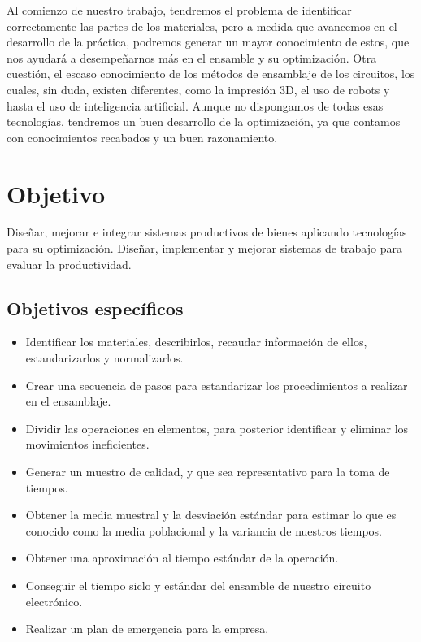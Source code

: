     Al comienzo de nuestro trabajo, tendremos el problema de identificar correctamente las partes de los materiales, pero a medida que avancemos en el desarrollo de la práctica, podremos generar un mayor conocimiento de estos, que nos ayudará a desempeñarnos más en el ensamble y su optimización.
    Otra cuestión, el escaso conocimiento de los métodos de ensamblaje de los circuitos, los cuales, sin duda, existen diferentes, como la impresión 3D, el uso de robots y hasta el uso de inteligencia artificial. Aunque no dispongamos de todas esas tecnologías, tendremos un buen desarrollo de la optimización, ya que contamos con conocimientos recabados y un buen razonamiento.
    
    
    \section{Objetivo}
    
    Diseñar, mejorar e integrar sistemas productivos de bienes aplicando tecnologías para su optimización. Diseñar, implementar y mejorar sistemas de trabajo para evaluar la productividad.
    
    
    \subsection{Objetivos específicos}
    
    \begin{itemize}
        \item Identificar los materiales, describirlos, recaudar información de ellos, estandarizarlos y normalizarlos.
        \item Crear una secuencia de pasos para estandarizar los procedimientos a realizar en el ensamblaje.
        \item Dividir las operaciones en elementos, para posterior identificar y eliminar los movimientos ineficientes.
        \item Generar un muestro de calidad, y que sea representativo para la toma de tiempos.
        
        \item Obtener la media muestral y la desviación estándar para estimar lo que es conocido como la media poblacional y la variancia de nuestros tiempos.
        \item Obtener una aproximación al tiempo estándar de la operación.
        \item Conseguir el tiempo siclo y estándar del ensamble de nuestro circuito electrónico.
        \item Realizar un plan de emergencia para la empresa.
        
    \end{itemize}
    
